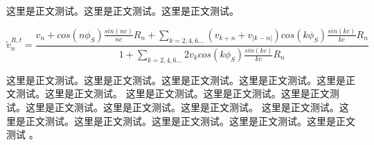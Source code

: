 \documentclass[prc,twocolumn,superscriptaddress,showkeys,showpacs,amssymb,amsmath,amsfonts,aps]{revtex4}
\begin{document}
这里是正文测试。这里是正文测试。这里是正文测试。
\begin{widetext}
\begin{equation}
 \tilde{v}_n^{R,t} = \frac{v_n+cos(n\phi_S)\frac{sin(nc)}{nc} R_n + \sum_{k=2,4,6...} (v_{k+n}+v_{|k-n|}) cos(k\phi_S) \frac{sin(kc)}{kc} R_n }{1+ \sum_{k=2,4,6...} 2 v_k cos(k \phi_S) \frac{sin(kc)}{kc} R_n}\label{Eq:vnEff}
 \end{equation}
\end{widetext}
这里是正文测试。这里是正文测试。这里是正文测试。这里是正文测试。这里是正文测试。这里是正文测试。
这里是正文测试。这里是正文测试。这里是正文测试。这里是正文测试。这里是正文测试。这里是正文测试。
这里是正文测试。这里是正文测试。这里是正文测试。这里是正文测试。这里是正文测试。这里是正文测试 \cite{Figueredo:2009dg,re111}。


\end{document}
